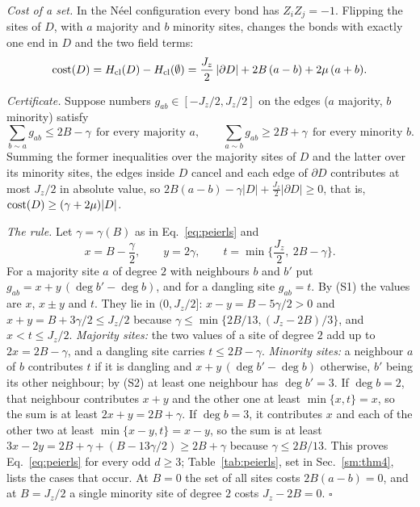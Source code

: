 \documentclass[aps,prx,onecolumn,10pt,nofootinbib,longbibliography,floatfix]{revtex4-2}
\theoremstyle{remark}
\newcommand{\Jz}{J_z}
\begin{document}
\emph{Cost of a set.} In the N\'eel configuration every bond has $Z_iZ_j=-1$. Flipping the sites of $D$, with $a$
majority and $b$ minority sites, changes the bonds with exactly one end in $D$ and the two field terms:
\begin{equation}
{\rm cost}(D)=H_{\rm cl}(D)-H_{\rm cl}(\emptyset)=\frac{\Jz}{2}\,|\partial D|+2B\,(a-b)+2\mu\,(a+b). %
\label{eq:cost}
\end{equation}

\emph{Certificate.} Suppose numbers $g_{ab}\in[-\Jz/2,\Jz/2]$ on the edges ($a$ majority, $b$ minority) satisfy
\begin{equation}
\sum_{b\sim a}g_{ab}\le2B-\gamma\ \ \text{for every majority }a,\qquad
\sum_{a\sim b}g_{ab}\ge2B+\gamma\ \ \text{for every minority }b . %
\label{eq:cert}
\end{equation}
Summing the former inequalities over the majority sites of $D$ and the latter over its minority sites, the edges
inside $D$ cancel and each edge of $\partial D$ contributes at most $\Jz/2$ in absolute value, so
$2B(a-b)-\gamma|D|+\frac{\Jz}{2}|\partial D|\ge0$, that is, ${\rm cost}(D)\ge(\gamma+2\mu)|D|$.

\emph{The rule.} Let $\gamma=\gamma(B)$ as in Eq.~\eqref{eq:peierls} and
\begin{equation}
x=B-\frac\gamma2,\qquad y=2\gamma,\qquad t=\min\Big\{\frac{\Jz}2,\ 2B-\gamma\Big\}. %
\end{equation}
For a majority site $a$ of degree $2$ with neighbours $b$ and $b'$ put %
$g_{ab}=x+y\,(\deg b'-\deg b)$, and for a dangling site $g_{ab}=t$. By (S1) the values are $x$, $x\pm y$ and $t$. %
They lie in $(0,\Jz/2]$: $x-y=B-5\gamma/2>0$ and $x+y=B+3\gamma/2\le\Jz/2$ because
$\gamma\le\min\{2B/13,(\Jz-2B)/3\}$, and $x<t\le\Jz/2$. \emph{Majority sites:} the two values of a site of degree %
$2$ add up to $2x=2B-\gamma$, and a dangling site carries $t\le2B-\gamma$. \emph{Minority sites:} a neighbour $a$ %
of $b$ contributes $t$ if it is dangling and $x+y\,(\deg b'-\deg b)$ otherwise, $b'$ being its other neighbour; by
(S2) at least one neighbour has $\deg b'=3$. If $\deg b=2$, that neighbour contributes $x+y$ and the other one at %
least $\min\{x,t\}=x$, so the sum is at least $2x+y=2B+\gamma$. If $\deg b=3$, it contributes $x$ and each of the
other two at least $\min\{x-y,t\}=x-y$, so the sum is at least $3x-2y=2B+\gamma+(B-13\gamma/2)\ge2B+\gamma$ %
because $\gamma\le2B/13$. This proves Eq.~\eqref{eq:peierls} for every odd $d\ge3$; Table~\ref{tab:peierls}, set in Sec.~\ref{sm:thm4}, lists %
the cases that occur. At $B=0$ the set of all sites costs $2B(a-b)=0$, and at $B=\Jz/2$ a single minority site of
degree $2$ costs $\Jz-2B=0$. \hfill$\square$
\end{document}
